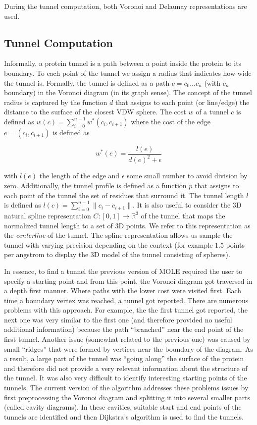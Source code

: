 \documentclass[11pt]{article} %
\newcommand{\rr}{\mathbb{R}}
\begin{document}
During the tunnel computation, both Voronoi and Delaunay representations are used.

\subsection{Tunnel Computation}
Informally, a protein tunnel is a path between a point inside the protein to its boundary. To each point of the tunnel we assign a radius that indicates how wide the tunnel is. Formally, the tunnel is defined as a path $c=c_0\dots c_n$ (with $c_n$ boundary) in the Voronoi diagram (in its graph sense). The concept of the tunnel radius is captured by the function $d$ that assigns to each point (or line/edge) the distance to the surface of the closest VDW sphere. The cost $w$ of a tunnel $c$ is defined as $w(c)=\sum_{i=0}^{n-1} w^*(c_i, c_{i+1})$ where the cost of the edge $e=(c_i, c_{i+1})$ is defined as 

\[w^*(e)=\frac{l(e)}{d(e)^2+\epsilon}\]

with $l(e)$ the length of the edge and $\epsilon$ some small number to avoid division by zero. Additionally, the tunnel profile is defined as a function $p$ that assigns to each point of the tunnel the set of residues that surround it. The tunnel length $l$ is defined as $l(c)=\sum_{i=0}^{n-1}\|c_i-c_{i+1}\|$. It is also useful to consider the 3D natural spline \cite{spline} representation $C: [0, 1] \rightarrow \rr^3$ of the tunnel that maps the normalized tunnel length to a set of 3D points. We refer to this representation as the \emph{centerline} of the tunnel. The spline representation allows us sample the tunnel with varying precision depending on the context (for example 1.5 points per angstrom to display the 3D model of the tunnel consisting of spheres).

In essence, to find a tunnel the previous version of MOLE \cite{mole} required the user to specify a starting point and from this point, the Voronoi diagram got traversed in a depth first manner. Where paths with the lower cost were visited first. Each time a boundary vertex was reached, a tunnel got reported. There are numerous problems with this approach. For example, the the first tunnel got reported, the next one was very similar to the first one (and therefore provided no useful additional information) because the path ``branched'' near the end point of the first tunnel. Another issue (somewhat related to the previous one) was caused by small ``ridges'' that were formed by vertices near the boundary of the diagram. As a result, a large part of the tunnel was ``going along'' the surface of the protein and therefore did not provide a very relevant information about the structure of the tunnel. It was also very difficult to identify interesting starting points of the tunnels. The current version of the algorithm addresses these problems issues by first preprocessing the Voronoi diagram and splitting it into several smaller parts (called cavity diagrams). In these cavities, suitable start and end points of the tunnels are identified and then Dijkstra's algorithm is used to find the tunnels.
\end{document}
